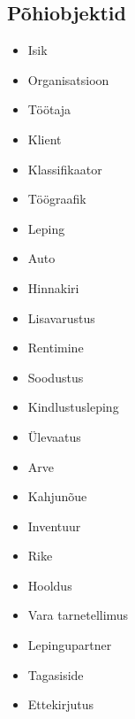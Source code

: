 \documentclass{report}
\begin{document}
\subsection{Põhiobjektid}
\begin{itemize}
 	\item Isik
 	\item Organisatsioon
 	\item Töötaja
 	\item Klient
 	\item Klassifikaator
 	\item Töögraafik
 	\item Leping
 	\item Auto
 	\item Hinnakiri
 	\item Lisavarustus
 	\item Rentimine
 	\item Soodustus
 	\item Kindlustusleping
 	\item Ülevaatus
 	\item Arve
 	\item Kahjunõue
 	\item Inventuur
 	\item Rike
 	\item Hooldus
 	\item Vara tarnetellimus
 	\item Lepingupartner
 	\item Tagasiside
 	\item Ettekirjutus
\end{itemize}
\end{document}
